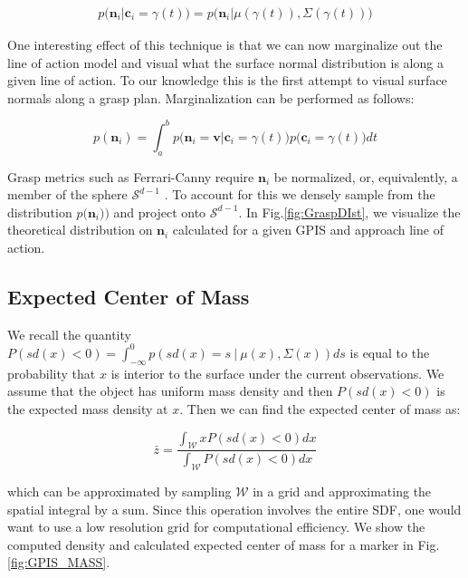 \documentclass[letterpaper, 10 pt, conference]{ieeeconf}  %
\begin{document}
\vspace{-2ex}
\begin{align*}
p\big(\textbf{n}_i|\textbf{c}_i = \gamma(t)\big) = p\big(\textbf{n}_i |\mu(\gamma(t)), \Sigma(\gamma(t)) \big)
\end{align*}

One interesting effect of this technique is that we can now marginalize out the line of action model and visual what the surface normal distribution is along a given line of action. To our knowledge this is the first attempt to visual surface normals along a grasp plan. Marginalization can be performed as follows:

\vspace{-2ex}
\begin{equation}
p(\textbf{n}_i ) = \int_a^b   p\big(\textbf{n}_i = \textbf{v} | \textbf{c}_i = \gamma(t) \big)p\big(\textbf{c}_i = \gamma(t)\big) dt
\end{equation}

Grasp metrics such as  Ferrari-Canny require $\textbf{n}_i$ be normalized, or, equivalently, a member of the sphere $\mathcal{S}^{d-1}$ \cite{ferrari1992}. To account for this we densely sample from the  distribution $p \big(\textbf{n}_i ) \big)$  and project onto $\mathcal{S}^{d-1}$.  In Fig.\ref{fig:GraspDIst}, we visualize the theoretical distribution on $\textbf{n}_i$ calculated for a given GPIS and approach line of action.


\subsection{Expected Center of Mass} 

We recall the quantity $P(sd(x) < 0) = \int_{-\infty}^{0} p(sd(x) =  s \ | \ \mu(x),\Sigma(x)) ds$ is equal to the probability that $x$ is interior to the surface under the current observations.
We assume that the object has uniform mass density and then $P(sd(x) < 0)$ is the expected mass density at $x$.
Then we can find the expected center of mass as:

\begin{equation}
  \bar{z} 
  =
  \frac
    {\int_{\mathcal{W}}x P(sd(x)<0) dx}
    {\int_{\mathcal{W}}  P(sd(x)<0) dx}
\end{equation}

which can be approximated by sampling $\mathcal{W}$ in a grid and approximating the spatial integral by a sum. Since this operation involves the entire SDF, one would want to use a low resolution grid for computational efficiency. We show the computed density and calculated expected center of mass for a marker in Fig. \ref{fig:GPIS_MASS}.
\end{document}
